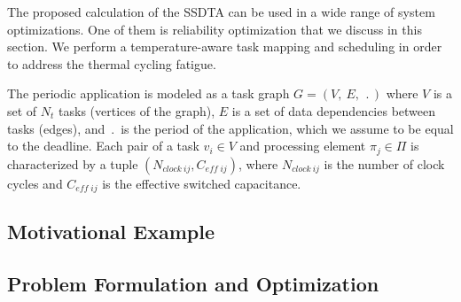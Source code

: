 The proposed calculation of the SSDTA can be used in a wide range of system optimizations. One of them is reliability optimization that we discuss in this section. We perform a temperature-aware task mapping and scheduling in order to address the thermal cycling fatigue.

 \label{sec:application-model}
The periodic application is modeled as a task graph $G = (V, \: E, \: \period)$ where $V$ is a set of $N_t$ tasks (vertices of the graph), $E$ is a set of data dependencies between tasks (edges), and $\period$ is the period of the application, which we assume to be equal to the deadline. Each pair of a task $v_i \in V$ and processing element $\pi_j \in \Pi$ is characterized by a tuple $(N_{clock \: ij}, C_{eff \; ij})$, where $N_{clock \: ij}$ is the number of clock cycles and $C_{eff \; ij}$ is the effective switched capacitance.

 \label{sec:reliability-model}


\subsection{Motivational Example}


\subsection{Problem Formulation and Optimization} \label{sec:reliability-problem}

